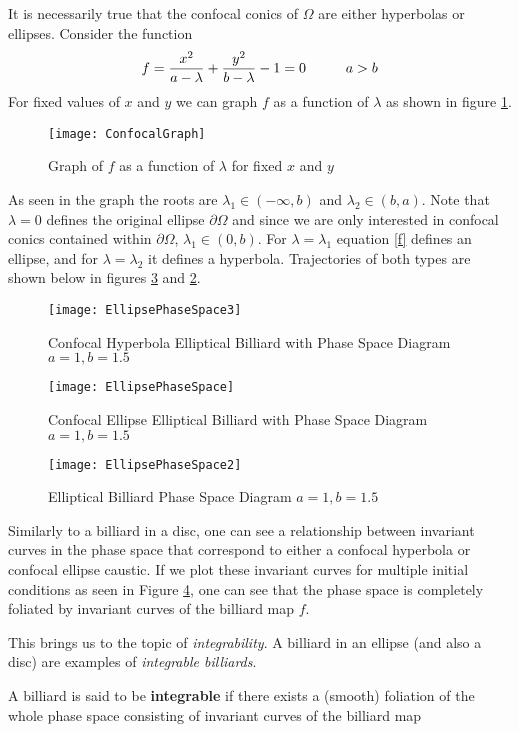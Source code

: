 It is necessarily true that the confocal conics of $\Omega$ are either hyperbolas or ellipses. Consider the function
\begin{equation}
    \label{f}
    f = \frac{x^2}{a - \lambda} + \frac{y^2}{b - \lambda} - 1 = 0 \hspace{10mm} a > b
\end{equation}
For fixed values of $x$ and $y$ we can graph $f$ as a function of $\lambda$ as shown in figure \ref{ConfocalGraph}. 
\begin{figure}[h]
    \centering
    \texttt{[image: ConfocalGraph]}
    \caption{Graph of $f$ as a function of $\lambda$ for fixed $x$ and $y$}
    \label{ConfocalGraph}
\end{figure}
As seen in the graph the roots are $\lambda_1 \in (-\infty, b)$ and  $\lambda_2 \in (b,a)$. Note that $\lambda = 0$ defines the original ellipse $\partial \Omega$ and since we are only interested in confocal conics contained within $\partial \Omega$, $\lambda_1 \in (0, b)$. For $\lambda = \lambda_1$ equation \ref{f} defines an ellipse, and for $\lambda = \lambda_2$ it defines a hyperbola. Trajectories of both types are shown below in figures \ref{ConfocalEllipse} and \ref{ConfocalHyperbola}.
\newpage
\begin{figure}[h]
    \centering
    \texttt{[image: EllipsePhaseSpace3]}
    \caption{Confocal Hyperbola Elliptical Billiard with Phase Space Diagram $a = 1, b = 1.5$}
    \label{ConfocalHyperbola}
\end{figure}
\begin{figure}[h]
    \centering
    \texttt{[image: EllipsePhaseSpace]}
    \caption{Confocal Ellipse Elliptical Billiard with Phase Space Diagram $a = 1, b = 1.5$}
    \label{ConfocalEllipse}
\end{figure}
\begin{figure}[h]
    \centering
    \texttt{[image: EllipsePhaseSpace2]}
    \caption{Elliptical Billiard Phase Space Diagram $a = 1, b = 1.5$}
    \label{EllipsePS}
\end{figure}
Similarly to a billiard in a disc, one can see a relationship between invariant curves in the phase space that correspond to either a confocal hyperbola or confocal ellipse caustic.    If we plot these invariant curves for multiple initial conditions as seen in Figure \ref{EllipsePS}, one can see that the phase space is completely foliated by invariant curves of the billiard map $f$. 

This brings us to the topic of \textit{integrability}. A billiard in an ellipse (and also a disc) are examples of \textit{integrable billiards}. 
\begin{definition}
A billiard is said to be \textbf{integrable} if there exists a (smooth) foliation of the whole phase space consisting of invariant curves of the billiard map
\end{definition}
\newpage

